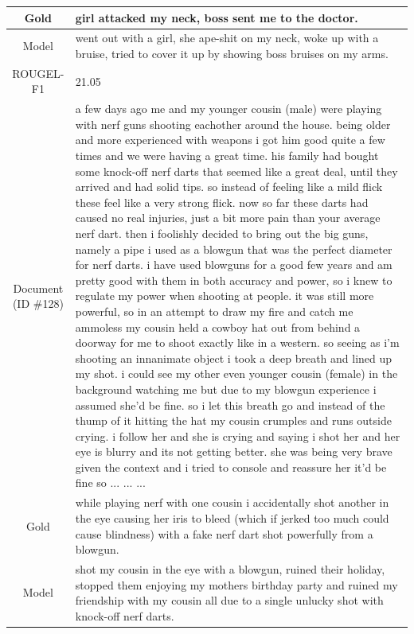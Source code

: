\begin{table}[bth!]
\begin{tabular}{c|p{}}
\\ \hline
Gold & 
girl attacked my neck, boss sent me to the doctor.
\\ \hline
Model & 
went out with a girl, she ape-shit on my neck, woke up with a bruise, tried to cover it up by showing boss bruises on my arms.
\\ \hline
ROUGEL-F1 & 
21.05
\\ \hline
\makecell{Document\\(ID \#128)} & 
a few days ago me and my younger cousin (male) were playing with nerf guns shooting eachother around the house. being older and more experienced with weapons i got him good quite a few times and we were having a great time. his family had bought some knock-off nerf darts that seemed like a great deal, until they arrived and had solid tips. so instead of feeling like a mild flick these feel like a very strong flick. now so far these darts had caused no real injuries, just a bit more pain than your average nerf dart. then i foolishly decided to bring out the big guns, namely a pipe i used as a blowgun that was the perfect diameter for nerf darts. i have used blowguns for a good few years and am pretty good with them in both accuracy and power, so i knew to regulate my power when shooting at people. it was still more powerful, so in an attempt to draw my fire and catch me ammoless my cousin held a cowboy hat out from behind a doorway for me to shoot exactly like in a western. so seeing as i'm shooting an innanimate object i took a deep breath and lined up my shot. i could see my other even younger cousin (female) in the background watching me but due to my blowgun experience i assumed she'd be fine. so i let this breath go and instead of the thump of it hitting the hat my cousin crumples and runs outside crying. i follow her and she is crying and saying i shot her and her eye is blurry and its not getting better. she was being very brave given the context and i tried to console and reassure her it'd be fine so ... ... ... 
\\ \hline
Gold & 
while playing nerf with one cousin i accidentally shot another in the eye causing her iris to bleed (which if jerked too much could cause blindness) with a fake nerf dart shot powerfully from a blowgun.
\\ \hline
Model & 
shot my cousin in the eye with a blowgun, ruined their holiday, stopped them enjoying my mothers birthday party and ruined my friendship with my cousin all due to a single unlucky shot with knock-off nerf darts.
\\ \hline

\end{tabular}
\end{table}
